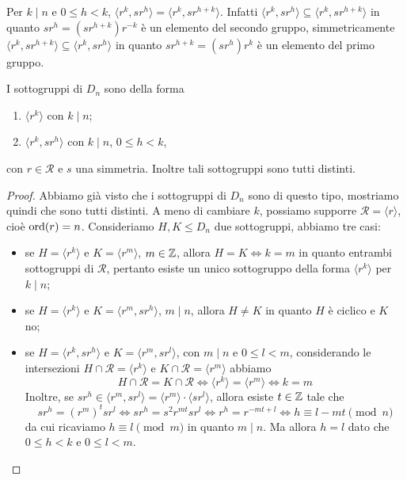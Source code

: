 \documentclass[11pt]{scrartcl}
\begin{document}
\begin{remark}
    Per $k \mid n$ e $0\leqslant h < k$, $\langle r^k, sr^h\rangle = 
    \langle r^k, sr^{h + k}\rangle$. Infatti $\langle r^k, sr^h\rangle \subseteq
    \langle r^k, sr^{h + k}\rangle$ in quanto $sr^h = (sr^{h + k})r^{-k}$ è
    un elemento del secondo gruppo, simmetricamente $\langle r^k, sr^{h + k}\rangle
    \subseteq \langle r^k, sr^h\rangle$ in quanto $sr^{h + k} = (sr^h)r^k$ è un
    elemento del primo gruppo.
\end{remark}

\begin{theorem}
I sottogruppi di $D_n$ sono della forma \begin{enumerate}[(1)]
    \item $\langle r^k\rangle$ con $k\mid n$;
    \item $\langle r^k, sr^h\rangle$ con $k \mid n$, $0\leqslant h < k$, 
\end{enumerate}
con $r \in \mathcal{R}$ e $s$ una simmetria. Inoltre tali sottogruppi sono
tutti distinti.
\end{theorem}

\begin{proof}
    Abbiamo già visto che i sottogruppi di $D_n$ sono di questo tipo, 
    mostriamo quindi che sono tutti distinti. A meno di cambiare $k$, possiamo
    supporre $\mathcal{R} = \langle r\rangle$, cioè $\operatorname{ord}(r) = n$. 
    Consideriamo $H, K\leqslant D_n$ due sottogruppi, abbiamo tre casi:
    \begin{itemize}
        \item se $H = \langle r^k\rangle$ e $K = \langle r^m\rangle$, $m \in \mathbb Z$,
        allora $H = K\iff k = m$ in quanto entrambi sottogruppi di $\mathcal{R}$, 
        pertanto esiste un unico sottogruppo della forma $\langle r^k\rangle$
        per $k \mid n$;
        \item se $H = \langle r^k\rangle$ e $K = \langle r^m, sr^h\rangle$, $m \mid n$,
        allora $H \neq K$ in quanto $H$ è ciclico e $K$ no;
        \item se $H = \langle r^k, sr^h\rangle$ e $K = \langle r^m, sr^l\rangle$, 
        con $m \mid n$ e $0\leqslant l < m$, considerando le intersezioni
        $H \cap \mathcal{R} = \langle r^k\rangle$ e $K \cap \mathcal{R} = \langle r^m\rangle$ 
        abbiamo \[
        H \cap \mathcal{R} = K\cap\mathcal{R} \iff \langle r^k\rangle = \langle r^m\rangle
        \iff k = m
        \] Inoltre, se $sr^h \in \langle r^m, sr^l\rangle = \langle r^m\rangle
        \cdot \langle sr^l\rangle$, allora esiste $t \in \mathbb Z$ tale che \[
        sr^h = (r^m)^t sr^l \iff sr^h = s^2r^{mt}sr^l \iff r^h = r^{-mt + l}
        \iff h \equiv l - mt \pmod n
        \]da cui ricaviamo $h \equiv l \pmod m$ in quanto $m \mid n$. Ma allora 
        $h =l$ dato che $0 \leqslant h < k$ e $0\leqslant l < m$.
    \end{itemize}
\end{proof}
\end{document}
